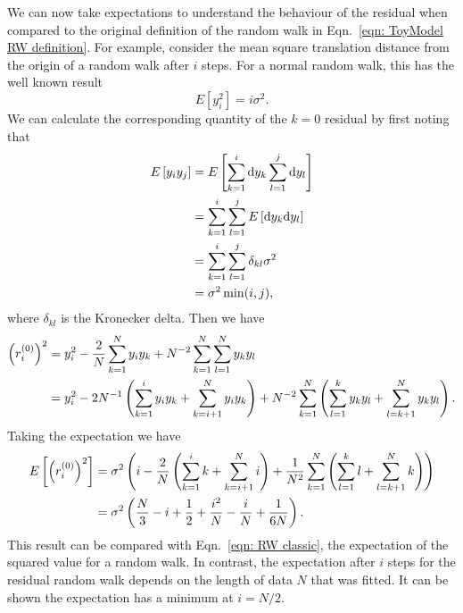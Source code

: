 \documentclass[../full_thesis/full_thesis.tex]{subfiles}
\begin{document}
\begin{subappendices}


We can now take expectations to understand the behaviour of the residual when
compared to the original definition of the random
walk in Eqn.~\eqref{eqn: ToyModel RW definition}. For example, consider
the mean square translation distance from the origin of a random walk after $i$
steps. For a normal random walk, this has the well known result
\begin{equation}
E[y_{i}^{2}] = i \sigma^{2}.
\label{eqn: RW classic}
\end{equation}
We can calculate the corresponding quantity of the $k=0$ residual by first
noting that
\begin{align}
E\left[y_{i}y_{j}\right] & = E\left[\sum_{k=1}^{i}\mathrm{d} y_{k} \sum_{l=1}^{j}\mathrm{d} y_{l} \right] \\
& = \sum_{k=1}^{i}\sum_{l=1}^{j}E\left[\mathrm{d} y_{k} \mathrm{d} y_{l}\right] \\
& = \sum_{k=1}^{i}\sum_{l=1}^{j} \delta_{kl} \sigma^{2} \\
& = \sigma^{2}\min(i, j),
\label{eqn: E yiyi}
\end{align}
where $\delta_{kl}$ is the Kronecker delta. Then we have
\begin{align}
\left(r^{(0)}_{i}\right)^{2} & = y_{i}^{2} - \frac{2}{N}\sum_{k=1}^{N}y_{i}y_{k} + N^{-2}\sum_{k=1}^{N}\sum_{l=1}^{N}y_{k}y_{l} \\
& =  y_{i}^{2} - 2 N^{-1} \left(\sum_{k=1}^{i}y_{i}y_{k} + \sum_{k=i+1}^{N}y_{i}y_{k} \right)+ N^{-2}\sum_{k=1}^{N}\left(\sum_{l=1}^{k}y_{k}y_{l} + \sum_{l=k+1}^{N}y_{k}y_{l} \right).
\end{align}
Taking the expectation we have
\begin{align}
E\left[\left(r^{(0)}_{i}\right)^{2} \right] & = \sigma^{2}\left(i - \frac{2}{N}\left(\sum_{k=1}^{i}k + \sum_{k=i+1}^{N}i \right)+ \frac{1}{N^{2}}\sum_{k=1}^{N}\left(\sum_{l=1}^{k}l+ \sum_{l=k+1}^{N}k \right) \right) \\
& = \sigma^{2}\left(\frac{N}{3} - i + \frac{1}{2} + \frac{i^{2}}{N} - \frac{i}{N} + \frac{1}{6 N}\right).
\end{align}
This result can be compared with Eqn.~\eqref{eqn: RW classic}, the expectation
of the squared value for a random walk.  In contrast, the expectation after $i$
steps for the residual random walk depends on the length of data $N$ that was
fitted. It can be shown the expectation has a minimum at $i=N/2$.


\end{subappendices}
\end{document}
